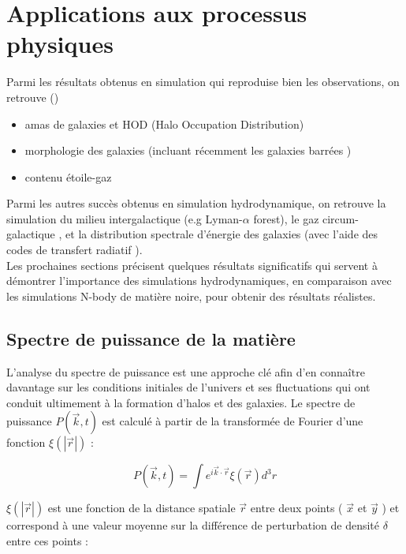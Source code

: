 \documentclass{article}
\begin{document}
\section{Applications aux processus physiques }

Parmi les résultats obtenus en simulation qui reproduise bien les observations, on retrouve (\cite{Vogelsberger2020})
\begin{itemize}

\item amas de galaxies et HOD (Halo Occupation Distribution)
\item morphologie des galaxies (incluant récemment les galaxies barrées \citep{Auriga_bars})
\item contenu étoile-gaz
\end{itemize}

Parmi les  autres succès obtenus en simulation hydrodynamique, on retrouve  la simulation du milieu intergalactique (e.g Lyman-$\alpha$ forest), le gaz circum-galactique \citep{Vogelsberger2020}, et la distribution spectrale d’énergie des galaxies (avec l'aide des codes de transfert radiatif \citep[par ex.,][]{SKIRT}). \\

Les prochaines sections précisent quelques résultats significatifs qui servent à démontrer l'importance des simulations hydrodynamiques, en comparaison avec les simulations N-body de matière noire, pour obtenir des résultats réalistes. 

\subsection{Spectre de puissance de la matière}

L’analyse du spectre de puissance est une approche clé afin d’en connaître davantage sur les conditions initiales de l'univers et ses fluctuations qui ont conduit ultimement à la formation d'halos et des galaxies. Le spectre de puissance $ P(\overrightarrow{k},t)$ est calculé à partir de la transformée de Fourier d'une fonction $\xi(|\overrightarrow{r}|)$ :

\[  P(\overrightarrow{k},t) = \int e^{i\overrightarrow{k}\cdot\overrightarrow{r} } \xi(\overrightarrow{r})   d^3r \]

$\xi(|\overrightarrow{r}|)$ est une fonction de la distance spatiale $\overrightarrow{r}$ entre deux points  ( $\overrightarrow{x}$ et $\overrightarrow{y}$ ) et correspond à une valeur moyenne sur la différence de perturbation de densité $\delta$ entre ces points : 
\end{document}
